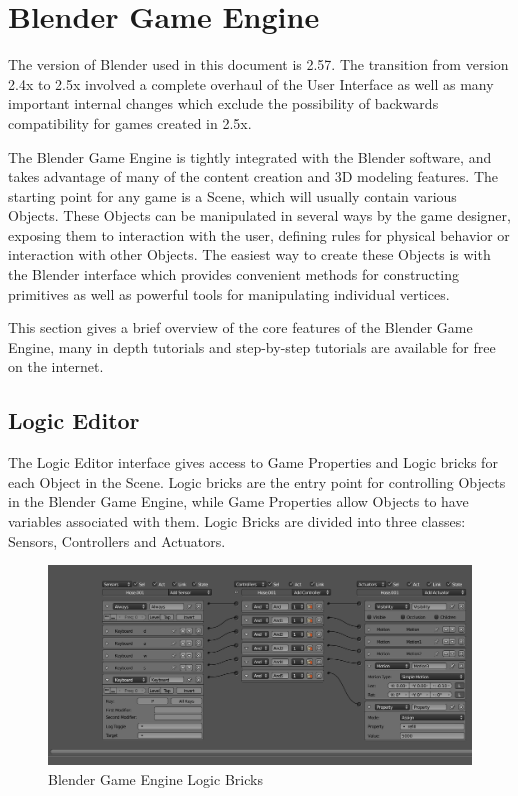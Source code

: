 \section{Blender Game Engine}

The version of Blender used in this document is 2.57. The transition from
version 2.4x to 2.5x involved a complete overhaul of the User Interface as well
as many important internal changes which exclude the possibility of backwards
compatibility for games created in 2.5x.


The Blender Game Engine is tightly integrated with the Blender software, and
takes advantage of many of the content creation and 3D modeling features. The
starting point for any game is a Scene, which will usually contain various
Objects. These Objects can be manipulated in several ways by the game designer,
exposing them to interaction with the user, defining rules for physical
behavior or interaction with other Objects. The easiest way to create these
Objects is with the Blender interface which provides convenient methods for
constructing primitives as well as powerful tools for manipulating individual
vertices.


This section gives a brief overview of the core features of the Blender Game
Engine, many in depth tutorials and step-by-step tutorials are available for
free on the internet.


\subsection{Logic Editor}

The Logic Editor interface gives access to Game Properties and Logic bricks for
each Object in the Scene.  Logic bricks are the entry point for controlling
Objects in the Blender Game Engine, while Game Properties allow Objects to have
variables associated with them. Logic Bricks are divided into three classes:
Sensors, Controllers and Actuators.

\begin{figure}[!htc]
 		\centering
		\includegraphics[scale=0.35]{figures/ui_logic.png}
        \caption{ Blender Game Engine Logic Bricks }
		\label{fig:logic}
\end{figure}


